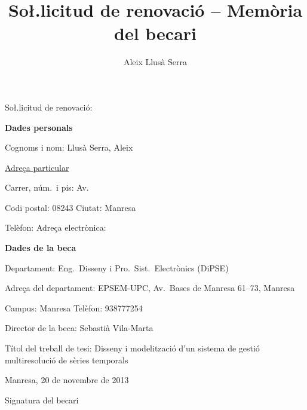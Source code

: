 \documentclass[paper=a4,parskip=half,
fontsize=11pt, %
]{scrartcl}
\title{So\l.licitud de renovació -- Memòria del becari}
\author{Aleix Llusà Serra}
\begin{document}
\mbox{}\vspace{1cm}

So\l.licitud de renovació:

\vfill

\textbf{Dades personals}

Cognoms i nom: Llusà Serra, Aleix

\underline{Adreça particular}

Carrer, núm.\ i pis: Av.\ 

Codi postal: 08243   Ciutat: Manresa

Telèfon:       Adreça electrònica: 


\vspace{2cm}


\textbf{Dades de la beca}

Departament: Eng.\ Disseny i Pro.\ Sist.\ Electrònics (DiPSE)

Adreça del departament: EPSEM-UPC, Av.\ Bases de Manresa 61--73, Manresa

Campus: Manresa  Telèfon: 938777254

Director de la beca: Sebastià Vila-Marta

Títol del treball de tesi: Disseny i modelització d'un sistema de gestió multiresolució de sèries temporals


\vfill

Manresa, 20 de novembre de 2013

\vspace{2cm}
\todo{}

Signatura del becari




\newpage









\printbibliography
\end{document}
